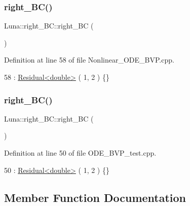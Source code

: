 \subsubsection{\texorpdfstring{right\+\_\+\+B\+C()}{right\_BC()}\hspace{0.1cm}{\footnotesize\ttfamily [1/2]}}
{\footnotesize\ttfamily Luna\+::right\+\_\+\+B\+C\+::right\+\_\+\+BC (\begin{DoxyParamCaption}{ }\end{DoxyParamCaption})\hspace{0.3cm}{\ttfamily [inline]}}



Definition at line 58 of file Nonlinear\+\_\+\+O\+D\+E\+\_\+\+B\+V\+P.\+cpp.


\begin{DoxyCode}
58 : \hyperlink{classLuna_1_1Residual}{Residual<double>} ( 1, 2 ) \{\}
\end{DoxyCode}
\mbox{\label{classLuna_1_1right__BC_af63a57e305306468e26f7bdb5842e1e6}} 
\subsubsection{\texorpdfstring{right\+\_\+\+B\+C()}{right\_BC()}\hspace{0.1cm}{\footnotesize\ttfamily [2/2]}}
{\footnotesize\ttfamily Luna\+::right\+\_\+\+B\+C\+::right\+\_\+\+BC (\begin{DoxyParamCaption}{ }\end{DoxyParamCaption})\hspace{0.3cm}{\ttfamily [inline]}}



Definition at line 50 of file O\+D\+E\+\_\+\+B\+V\+P\+\_\+test.\+cpp.


\begin{DoxyCode}
50 : \hyperlink{classLuna_1_1Residual}{Residual<double>} ( 1, 2 ) \{\}
\end{DoxyCode}


\subsection{Member Function Documentation}
\mbox{\label{classLuna_1_1right__BC_a513bb865a218a9ee309727839496afe0}} 
